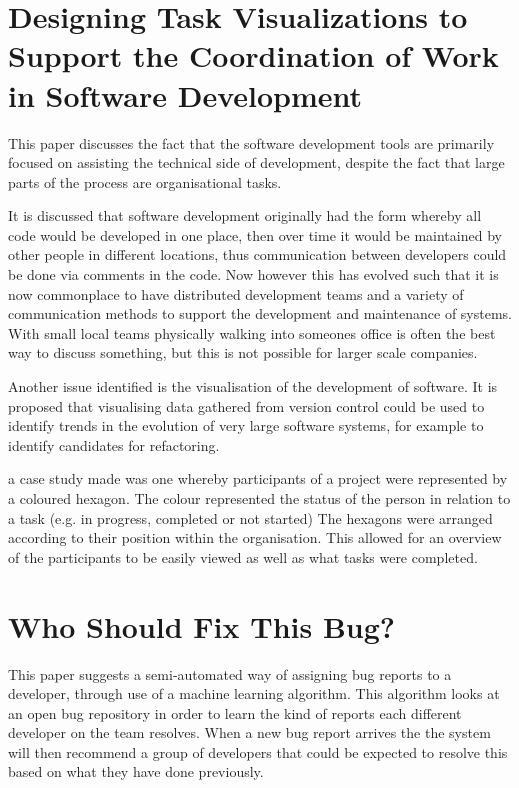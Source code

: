\documentclass{l4proj}
\begin{document}
\section{Designing Task Visualizations to Support the Coordination of Work in Software Development}

This paper discusses the fact that the software development tools are primarily focused on assisting the technical side of development, despite the fact that large parts of the process are organisational tasks.

It is discussed that software development originally had the form whereby all code would be developed in one place, then over time it would be maintained by other people in different locations, thus communication between developers could be done via comments in the code.  Now however this has evolved such that it is now commonplace to have distributed development teams and a variety of communication methods to support the development and maintenance of systems.  With small local teams physically walking into someones office is often the best way to discuss something, but this is not possible for larger scale companies.

Another issue identified is the visualisation of the development of software.  It is proposed that visualising data gathered from version control could be used to identify trends in the evolution of very large software systems, for example to identify candidates for refactoring.  

a case study made was one whereby participants of a project were represented by a coloured hexagon.  The colour represented the status of the person in relation to a task (e.g. in progress, completed or not started)
The hexagons were arranged according to their position within the organisation.  This allowed for an overview of the participants to be easily viewed as well as what tasks were completed.


\section {Who Should Fix This Bug?}

This paper suggests a semi-automated way of assigning bug reports to a developer, through use of a machine learning algorithm.  This algorithm looks at an open bug repository in order to learn the kind of reports each different developer on the team resolves.  When a new bug report arrives the the system will then recommend a group of developers that could be expected to resolve this based on what they have done previously.
\end{document}
